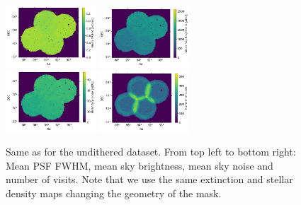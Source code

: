 \documentclass[\docopts]{\docclass}
\begin{document}
\begin{figure}
\centering
\includegraphics[width=0.30\textwidth]{ud_mean_fwhm.png}
\includegraphics[width=0.30\textwidth]{ud_mean_sky.png}\\
\includegraphics[width=0.30\textwidth]{ud_mean_skynoise.png}
\includegraphics[width=0.30\textwidth]{ud_nvisits.png}
\caption{Same as  for the undithered dataset. From top left to bottom right: Mean PSF FWHM, mean sky brightness, mean sky noise and number of visits. Note that we use the same extinction and stellar density maps changing the geometry of the mask.}
\label{fig:systematic_maps_ud}
\end{figure}
\end{document}
